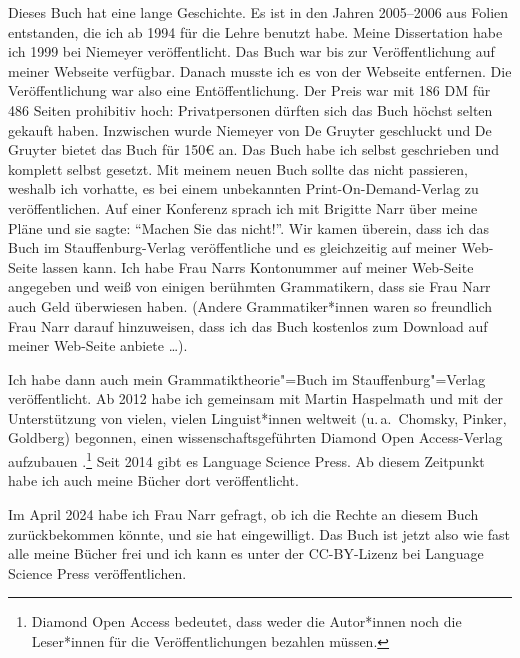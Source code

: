 Dieses Buch hat eine lange Geschichte. Es ist in den Jahren 2005–2006 aus Folien entstanden, die ich
ab 1994 für die Lehre benutzt habe. Meine Dissertation habe ich 1999 bei Niemeyer
veröffentlicht. Das Buch war bis zur Veröffentlichung auf meiner Webseite verfügbar. Danach musste
ich es von der Webseite entfernen. Die Veröffentlichung war also eine Entöffentlichung. Der Preis
war mit 186 DM für 486 Seiten prohibitiv hoch: Privatpersonen dürften sich das Buch höchst selten
gekauft haben. Inzwischen wurde Niemeyer von De Gruyter geschluckt und De Gruyter bietet das Buch für 150€
an. Das Buch habe ich selbst geschrieben und komplett selbst gesetzt. Mit meinem neuen Buch sollte das nicht passieren,
weshalb ich vorhatte, es bei einem unbekannten Print-On-Demand-Verlag zu veröffentlichen. Auf einer
Konferenz sprach ich mit Brigitte Narr über meine Pläne und sie sagte: "`Machen Sie das
nicht!"'. Wir kamen überein, dass ich das Buch im Stauffenburg-Verlag veröffentliche und es
gleichzeitig auf meiner Web-Seite lassen kann. Ich habe Frau Narrs Kontonummer auf meiner Web-Seite
angegeben und weiß von einigen berühmten Grammatikern, dass sie Frau Narr auch Geld überwiesen
haben. (Andere Grammatiker*innen waren so freundlich Frau Narr darauf hinzuweisen, dass ich das Buch
kostenlos zum Download auf meiner Web-Seite anbiete \ldots). 

Ich habe dann auch mein Grammatiktheorie"=Buch im Stauffenburg"=Verlag veröffentlicht. Ab 2012 habe
ich gemeinsam mit Martin Haspelmath und mit der Unterstützung von vielen, vielen Linguist*innen
weltweit (u.\,a.\ Chomsky, Pinker, Goldberg) begonnen, einen wissenschaftsgeführten Diamond Open
Access-Verlag aufzubauen \citep{MuellerOA}.\footnote{Diamond Open Access bedeutet, dass weder die Autor*innen noch die
Leser*innen für die Veröffentlichungen bezahlen müssen.} Seit 2014 gibt es Language Science Press. Ab diesem Zeitpunkt habe ich
auch meine Bücher dort veröffentlicht. 

Im April 2024 habe ich Frau Narr
gefragt, ob ich die Rechte an diesem Buch zurückbekommen könnte, und sie hat eingewilligt. Das Buch
ist jetzt also wie fast alle meine Bücher frei und ich kann es unter der CC-BY-Lizenz bei Language
Science Press veröffentlichen.

